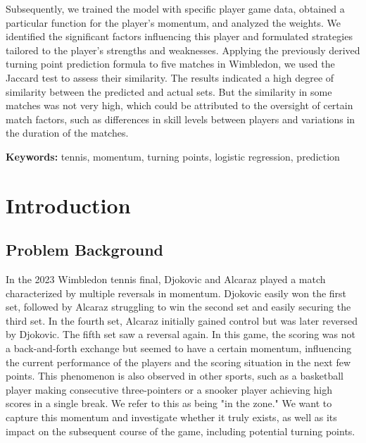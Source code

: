 \documentclass[UTF8]{ctexart} %
\begin{document}
Subsequently, we trained the model with specific player game data, obtained a particular function for the player's momentum, and analyzed the weights. 
We identified the significant factors influencing this player and formulated strategies tailored to the player's strengths and weaknesses. 
Applying the previously derived turning point prediction formula to five matches in Wimbledon, we used the Jaccard test to assess their similarity. 
The results indicated a high degree of similarity between the predicted and actual sets. But the similarity in some matches was not very high, 
which could be attributed to the oversight of certain match factors, such as differences in skill levels between players and variations in the duration of the matches.

\noindent \textbf{Keywords:} tennis, momentum, turning points, logistic regression, prediction 


\newpage
\tableofcontents
\newpage


\section{\textbf{Introduction}}
\subsection{\textbf{Problem Background}}
In the 2023 Wimbledon tennis final, Djokovic and Alcaraz played a match characterized by multiple reversals in momentum. Djokovic easily won the first set, followed by Alcaraz struggling to win the second set and easily securing the third set. 
In the fourth set, Alcaraz initially gained control but was later reversed by Djokovic. The fifth set saw a reversal again. In this game, the scoring was not a back-and-forth exchange but seemed to have a certain momentum, 
influencing the current performance of the players and the scoring situation in the next few points. This phenomenon is also observed in other sports, such as a basketball player making consecutive three-pointers or a snooker player achieving high scores in a single break. 
We refer to this as being "in the zone." We want to capture this momentum and investigate whether it truly exists, as well as its impact on the subsequent course of the game, including potential turning points.
\end{document}
